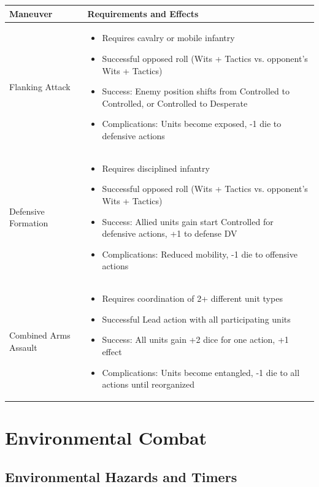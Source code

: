 \documentclass[11pt,letterpaper]{article}
\begin{document}
\begin{longtable}{|>{\raggedright\arraybackslash}p{4cm}|>{\raggedright\arraybackslash}p{8cm}|}
\hline
\textbf{Maneuver} & \textbf{Requirements and Effects} \\
\hline
Flanking Attack & 
\begin{itemize}
    \item Requires cavalry or mobile infantry
    \item Successful opposed roll (Wits + Tactics vs. opponent's Wits + Tactics)
    \item Success: Enemy position shifts from Controlled to Controlled, or Controlled to Desperate
    \item Complications: Units become exposed, -1 die to defensive actions
\end{itemize} \\
\hline
Defensive Formation & 
\begin{itemize}
    \item Requires disciplined infantry
    \item Successful opposed roll (Wits + Tactics vs. opponent's Wits + Tactics)
    \item Success: Allied units gain start Controlled for defensive actions, +1 to defense DV
    \item Complications: Reduced mobility, -1 die to offensive actions
\end{itemize} \\
\hline
Combined Arms Assault & 
\begin{itemize}
    \item Requires coordination of 2+ different unit types
    \item Successful Lead action with all participating units
    \item Success: All units gain +2 dice for one action, +1 effect
    \item Complications: Units become entangled, -1 die to all actions until reorganized
\end{itemize} \\
\hline
\end{longtable}

\newpage

\section{Environmental Combat}

\subsection{Environmental Hazards and Timers}
\end{document}
